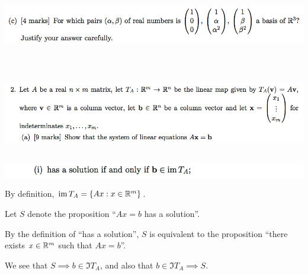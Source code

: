 \documentclass[12pt]{article}
\begin{document}
~\\
\newpage
\begin{mdframed}
\includegraphics[width=400pt]{img/oxford-prelims-2017-A-1-3.png}
\end{mdframed}

~\\
\subsection*{}  %
\begin{mdframed}
\includegraphics[width=400pt]{img/oxford-prelims-2017-A-2-1.png}
\end{mdframed}

\subsection*{}  %
\begin{mdframed}
\includegraphics[width=400pt]{img/oxford-prelims-2017-A-2-1-1.png}
\end{mdframed}

By definition,  $\operatorname{\text{im}} T_A = \{Ax: x \in \mathbb{R}^m\}$.

Let $S$ denote the proposition ``$Ax = b$ has a solution''.

By the definition of ``has a solution'', $S$ is equivalent to the proposition
``there exists $x \in \mathbb{R}^m$ such that $Ax = b$''.

We see that $S \implies b \in \Im T_A$, and also that $b \in \Im T_A \implies S$.



\end{document}
